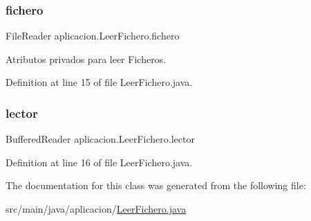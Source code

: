 \subsubsection{\texorpdfstring{fichero}{fichero}}
{\footnotesize\ttfamily File\+Reader aplicacion.\+Leer\+Fichero.\+fichero\hspace{0.3cm}{\ttfamily [private]}}

Atributos privados para leer Ficheros. 

Definition at line 15 of file Leer\+Fichero.\+java.

\hypertarget{classaplicacion_1_1_leer_fichero_ad2530808a0febf01b96fdddf04eea34a}{}\label{classaplicacion_1_1_leer_fichero_ad2530808a0febf01b96fdddf04eea34a} 
\subsubsection{\texorpdfstring{lector}{lector}}
{\footnotesize\ttfamily Buffered\+Reader aplicacion.\+Leer\+Fichero.\+lector\hspace{0.3cm}{\ttfamily [private]}}



Definition at line 16 of file Leer\+Fichero.\+java.



The documentation for this class was generated from the following file\+:\begin{DoxyCompactItemize}
\item 
src/main/java/aplicacion/\hyperlink{_leer_fichero_8java}{Leer\+Fichero.\+java}\end{DoxyCompactItemize}
